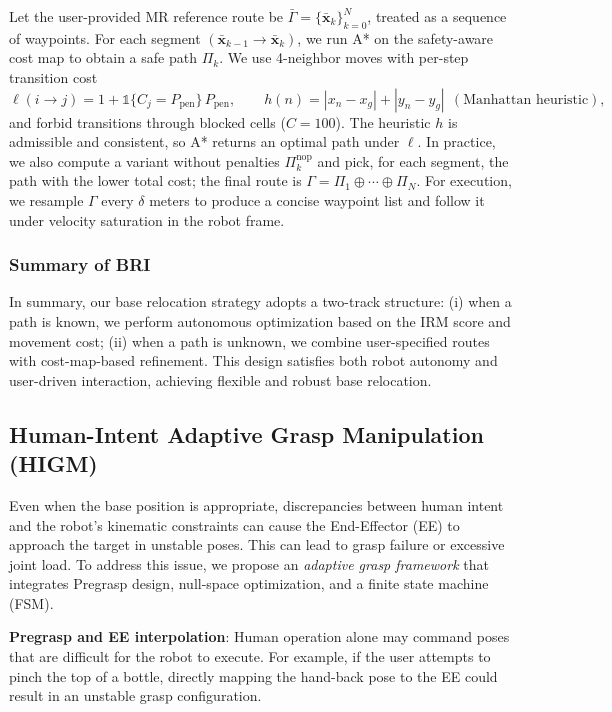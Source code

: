 \documentclass[../../main.tex]{subfiles} %
\begin{document}
Let the user-provided MR reference route be
$\bar{\Gamma}=\{\bar{\mathbf{x}}_k\}_{k=0}^{N}$, treated as a sequence of waypoints.
For each segment $(\bar{\mathbf{x}}_{k-1}\!\to\!\bar{\mathbf{x}}_{k})$,
we run A* on the safety-aware cost map to obtain a safe path $\Pi_k$.
We use 4-neighbor moves with per-step transition cost
\[
\ell(i\!\to\!j)=1+\mathbb{1}\{C_j=P_{\text{pen}}\}\,P_{\text{pen}},
\qquad
h(n)=|x_n-x_g|+|y_n-y_g| \ \ (\text{Manhattan heuristic}),
\]
and forbid transitions through blocked cells ($C=100$).
The heuristic $h$ is admissible and consistent, so A* returns an optimal path under $\ell$.
In practice, we also compute a variant without penalties $\Pi_k^{\text{nop}}$ and pick, for each
segment, the path with the lower total cost; the final route is
$\Gamma=\Pi_1\oplus\cdots\oplus\Pi_N$.
For execution, we resample $\Gamma$ every $\delta$ meters to produce a concise waypoint list
and follow it under velocity saturation in the robot frame. 



\subsubsection{Summary of BRI}
In summary, our base relocation strategy adopts a two-track structure:  
(i) when a path is known, we perform autonomous optimization based on the IRM score and movement cost;  
(ii) when a path is unknown, we combine user-specified routes with cost-map-based refinement.  
This design satisfies both robot autonomy and user-driven interaction, achieving flexible and robust base relocation.



\subsection{Human-Intent Adaptive Grasp Manipulation (HIGM)}

Even when the base position is appropriate, discrepancies between human intent and the robot’s 
kinematic constraints can cause the End-Effector (EE) to approach the target in unstable poses.  
This can lead to grasp failure or excessive joint load.  
To address this issue, we propose an \textit{adaptive grasp framework} that integrates Pregrasp design, 
null-space optimization, and a finite state machine (FSM).

\medskip
\textbf{Pregrasp and EE interpolation}:  
Human operation alone may command poses that are difficult for the robot to execute.  
For example, if the user attempts to pinch the top of a bottle, 
directly mapping the hand-back pose to the EE could result in an unstable grasp configuration.
\end{document}
